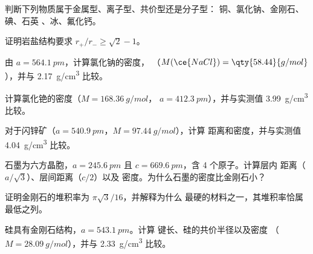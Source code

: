 \begin{exercise}[$\star$]\label{exo:b1:crystals-ionic-covalent:4}
判断下列物质属于金属型、离子型、共价型还是分子型：
铜、氯化钠、金刚石、碘、石英 、冰、氟化钙。
\end{exercise}

\begin{exercise}[$\star\star$]\label{exo:b1:crystals-ionic-covalent:5}
证明岩盐结构要求 $r_+/r_- \ge \sqrt2 - 1$。
\end{exercise}

\begin{exercise}[$\star\star$]\label{exo:b1:crystals-ionic-covalent:6}
由 $a = \qty{564.1}{pm}$，计算氯化钠的密度，
（$M(\ce{NaCl}) = \qty{58.44}{g/mol}$），并与
\qty{2.17}{g/cm^3} 比较。
\end{exercise}

\begin{exercise}[$\star\star$]\label{exo:b1:crystals-ionic-covalent:7}
计算氯化铯的密度（$M = \qty{168.36}{g/mol}$，
$a = \qty{412.3}{pm}$），并与实测值 \qty{3.99}{g/cm^3} 比较。
\end{exercise}

\begin{exercise}[$\star\star$]\label{exo:b1:crystals-ionic-covalent:8}
对于闪锌矿（$a = \qty{540.9}{pm}$，$M = \qty{97.44}{g/mol}$），计算
 距离和密度，并与实测值
\qty{4.04}{g/cm^3} 比较。
\end{exercise}

\begin{exercise}[$\star\star$]\label{exo:b1:crystals-ionic-covalent:9}
石墨为六方晶胞，$a = \qty{245.6}{pm}$ 且
$c = \qty{669.6}{pm}$，含 4 个原子。计算层内
 距离（$a/\sqrt3$）、层间距离（$c/2$）以及
密度。为什么石墨的密度比金刚石小？
\end{exercise}

\begin{exercise}[$\star\star\star$]\label{exo:b1:crystals-ionic-covalent:10}
证明金刚石的堆积率为 $\pi\sqrt3/16$，并解释为什么
最硬的材料之一，其堆积率恰属最低之列。
\end{exercise}

\begin{exercise}[$\star\star\star$]\label{exo:b1:crystals-ionic-covalent:11}
硅具有金刚石结构，$a = \qty{543.1}{pm}$。计算
 键长、硅的共价半径以及密度
（$M = \qty{28.09}{g/mol}$），并与 \qty{2.33}{g/cm^3} 比较。
\end{exercise}

